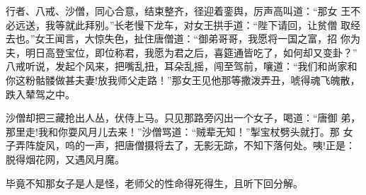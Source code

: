 行者、八戒、沙僧，同心合意，结束整齐，径迎着銮舆，厉声高叫道：“那女
王不必远送，我等就此拜别。”长老慢下龙车，对女王拱手道：“陛下请回，让贫僧
取经去也。”女王闻言，大惊失色，扯住唐僧道：“御弟哥哥，我愿将一国之富，招
你为夫，明日高登宝位，即位称君，我愿为君之后，喜筵通皆吃了，如何却又变卦？”
八戒听说，发起个风来，把嘴乱扭，耳朵乱摇，闯至驾前，嚷道：“我们和尚家和
你这粉骷髅做甚夫妻!放我师父走路！”那女王见他那等撒泼弄丑，唬得魂飞魄散，
跌入辇驾之中。

沙僧却把三藏抢出人丛，伏侍上马。只见那路旁闪出一个女子，喝道：“唐御
弟，那里走!我和你耍风月儿去来！”沙僧骂道：“贼辈无知！”掣宝杖劈头就打。那
女子弄阵旋风，呜的一声，把唐僧摄将去了，无影无踪，不知下落何处。咦!正是：
脱得烟花网，又遇风月魔。

毕竟不知那女子是人是怪，老师父的性命得死得生，且听下回分解。